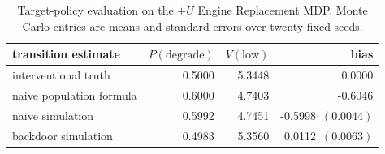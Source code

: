 \begin{table}[H]
\centering
\caption{Target-policy evaluation on the $+U$ Engine Replacement MDP. Monte Carlo entries are means and standard errors over twenty fixed seeds.}
\label{tab:engine_confounding}
\begin{tabular}{lrrr}
\hline
transition estimate & $P(\mathrm{degrade})$ & $V(\mathrm{low})$ & bias \\
\hline
interventional truth & 0.5000 & 5.3448 & 0.0000 \\
naive population formula & 0.6000 & 4.7403 & -0.6046 \\
naive simulation & 0.5992 & 4.7451 & -0.5998 $\,(0.0044)$ \\
backdoor simulation & 0.4983 & 5.3560 & 0.0112 $\,(0.0063)$ \\
\hline
\end{tabular}
\end{table}

